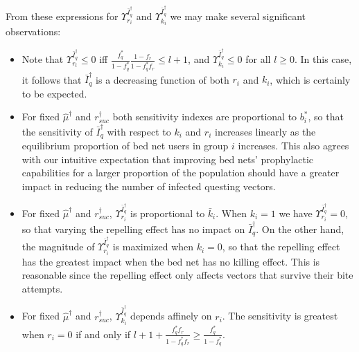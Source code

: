 \documentclass[a4paper]{article}
\newcommand{\varpiVar}{r_{suc}}
\begin{document}
%
%
%
From these expressions for $\varUpsilon_{r_i}^{\bar I_q^\dagger }$ and $\varUpsilon_{k_i}^{\bar I_q^\dagger }$ we may make several significant observations:
\begin{itemize}
\item
Note that $\varUpsilon_{r_i}^{\bar I_q^\dagger }\leqslant0$ iff $\frac{f^*_q}{1-f^*_q}\frac{1-f_r}{1-f^*_qf_r}\leqslant l+1$, and $\varUpsilon_{k_i}^{\bar I_q^\dagger }\leqslant0$  for all $l\geqslant0$. 
In this case, it follows  that $\bar I^\dagger _q$ is a decreasing function of both $r_i$ and $k_i$, which is certainly to be expected.
\item
 For fixed $\hat \mu^\dagger $ and $\varpiVar ^\dagger $ both sensitivity indexes are proportional to  $b_i^*$, so that the sensitivity of $\bar I_q^\dagger $ with respect to $k_i$ and $r_i$  increases linearly as the equilibrium proportion of bed net users in group $i$ increases. This also agrees with our intuitive expectation that improving bed nets' prophylactic capabilities for a larger proportion of the population should have a greater impact in reducing the number of infected questing vectors.
\item
For fixed $\hat \mu^\dagger $ and $\varpiVar ^\dagger $, $\varUpsilon_{r_i}^{\bar I_q^\dagger }$  is proportional to  $\bar k_i$. When  $k_i=1$ we have $\varUpsilon_{r_i}^{\bar I_q^\dagger } = 0$, so that varying the repelling effect has no impact on $\bar I^\dagger _q$. On the other hand,  the magnitude of $\varUpsilon_{r_i}^{\bar I_q^\dagger }$ is maximized when $k_i=0$, so that the repelling effect has the greatest impact when the bed net has no killing effect. This is reasonable since the repelling effect only affects vectors that survive their bite attempts.
\item
For fixed $\hat \mu^\dagger $ and $\varpiVar ^\dagger $, $\varUpsilon_{k_i}^{\bar I_q^\dagger }$  depends affinely on $r_i$. The sensitivity is greatest when 
$r_i=0$ if and only if  $l+1  +  \frac{f_q^*f_r}{1-f_q^*f_r} \geqslant \frac{f_q^*}{1-f_q^*}$.

\end{itemize}
\end{document}
